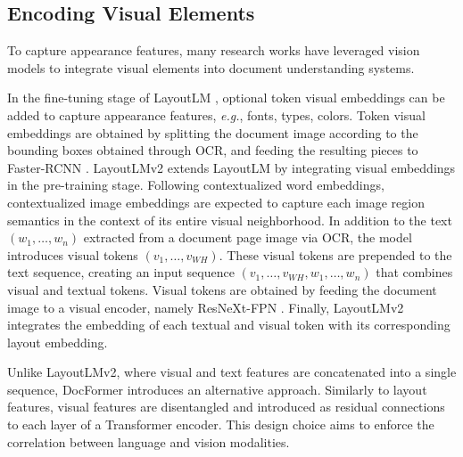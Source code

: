
\subsection{Encoding Visual Elements} 

To capture appearance features, many research works have leveraged vision models to integrate visual elements into document understanding systems.


In the fine-tuning stage of LayoutLM \citep{xu2020layoutlm}, optional token visual embeddings can be added to capture appearance features, \textit{e.g.}, fonts, types, colors. Token visual embeddings are obtained by splitting the document image according to the bounding boxes obtained through \ac{OCR}, and feeding the resulting pieces to Faster-RCNN \citep{ren2015faster}. LayoutLMv2 \citep{xu2020layoutlmv2} extends LayoutLM by integrating visual embeddings in the pre-training stage. Following contextualized word embeddings, contextualized image embeddings are expected to capture each image region semantics in the context of its entire visual neighborhood. In addition to the text $(w_1, \ldots, w_n)$ extracted from a document page image via \ac{OCR}, the model introduces visual tokens $(v_1, \ldots, v_{WH})$. These visual tokens are prepended to the text sequence, creating an input sequence $(v_1, \ldots, v_{WH}, w_1, \ldots, w_n)$ that combines visual and textual tokens. Visual tokens are obtained by feeding the document image to a visual encoder, namely ResNeXt-FPN \citep{xie2017aggregated, lin2017feature}. Finally, LayoutLMv2 integrates the embedding of each textual and visual token with its corresponding layout embedding. 

Unlike LayoutLMv2, where visual and text features are concatenated into a single sequence, DocFormer \citep{appalaraju2021docformer} introduces an alternative approach. Similarly to layout features, visual features are disentangled and introduced as residual connections to each layer of a Transformer encoder. This design choice aims to enforce the correlation between language and vision modalities. 

